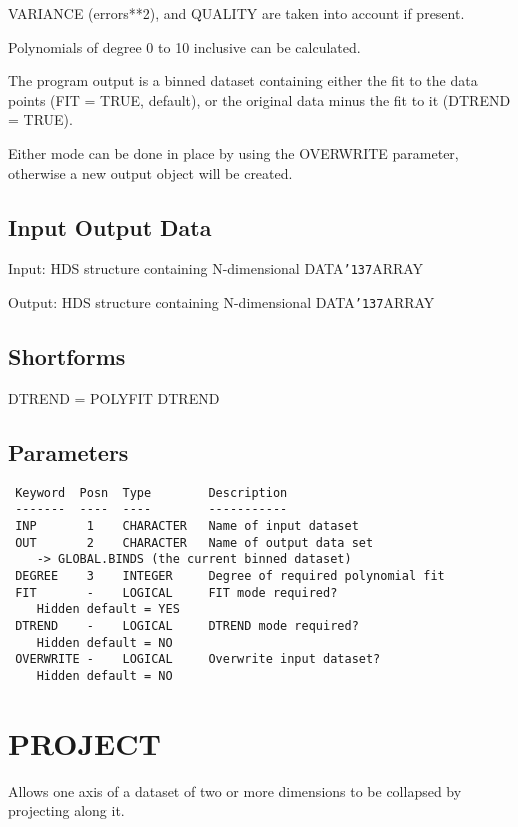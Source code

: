 \documentclass{book}
\renewcommand{\_}{{\tt\char'137}}     %
\begin{document}
VARIANCE (errors**2), and QUALITY are taken into account if present.

Polynomials of degree 0 to 10 inclusive can be calculated.

The program output is a binned dataset containing either the fit
to the data points (FIT = TRUE, default), or the original data
minus the fit to it (DTREND = TRUE).

Either mode can be done in place by using the OVERWRITE
parameter, otherwise a new output object will be created.

\subsection{Input Output Data}
Input: HDS structure containing N-dimensional DATA\_ARRAY

Output: HDS structure containing N-dimensional DATA\_ARRAY

\subsection{Shortforms}
DTREND = POLYFIT DTREND
\subsection{Parameters}
\begin{verbatim}
 Keyword  Posn  Type        Description
 -------  ----  ----        -----------
 INP       1    CHARACTER   Name of input dataset
 OUT       2    CHARACTER   Name of output data set
    -> GLOBAL.BINDS (the current binned dataset)
 DEGREE    3    INTEGER     Degree of required polynomial fit
 FIT       -    LOGICAL     FIT mode required?
    Hidden default = YES
 DTREND    -    LOGICAL     DTREND mode required?
    Hidden default = NO
 OVERWRITE -    LOGICAL     Overwrite input dataset?
    Hidden default = NO

\end{verbatim}\section{PROJECT}
Allows one axis of a dataset of two or more dimensions to be
collapsed by projecting along it.
\end{document}
